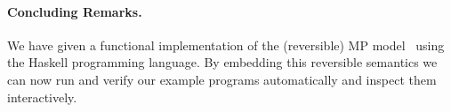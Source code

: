 \documentclass[runningheads,plain]{llncs}
\begin{document}
%
%
%
%
%


\paragraph{Concluding Remarks.}\label{conclusion}

We have given a functional implementation of the (reversible) MP model~\cite{DBLP:conf/ppdp/MezzinaP17} using the Haskell
programming language. By embedding this reversible semantics we can now run and
verify our example programs automatically and inspect them
interactively.
\end{document}
